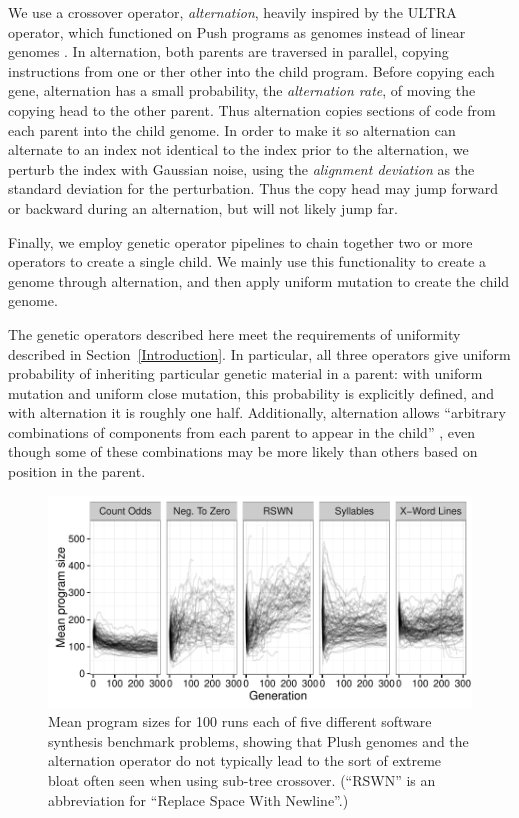 \documentclass[graybox]{svmult}
\begin{document}
We use a crossover operator, \textit{alternation}, heavily inspired by the ULTRA operator, which functioned on Push programs as genomes instead of linear genomes \cite{Spector:2013:GPTP}. In alternation, both parents are traversed in parallel, copying instructions from one or ther other into the child program. Before copying each gene, alternation has a small probability, the \textit{alternation rate}, of moving the copying head to the other parent. Thus alternation copies sections of code from each parent into the child genome. In order to make it so alternation can alternate to an index not identical to the index prior to the alternation, we perturb the index with Gaussian noise, using the \textit{alignment deviation} as the standard deviation for the perturbation. Thus the copy head may jump forward or backward during an alternation, but will not likely jump far.

Finally, we employ genetic operator pipelines to chain together two or more operators to create a single child. We mainly use this functionality to create a genome through alternation, and then apply uniform mutation to create the child genome.

The genetic operators described here meet the requirements of uniformity described in Section~\ref{Introduction}. In particular, all three operators give uniform probability of inheriting particular genetic material in a parent: with uniform mutation and uniform close mutation, this probability is explicitly defined, and with alternation it is roughly one half. Additionally, alternation allows ``arbitrary combinations of components from each parent to appear in the child'' \cite{Spector:2013:GPTP}, even though some of these combinations may be more likely than others based on position in the parent.

\begin{figure}[tb]
\includegraphics[width=\textwidth]{program_sizes_3x6_relabelled}
\caption{Mean program sizes for 100 runs each of five different software synthesis benchmark problems, showing that Plush genomes and the alternation operator do not typically lead to the sort of extreme bloat often seen when using sub-tree crossover. (``RSWN'' is an abbreviation for ``Replace Space With Newline''.)}
\label{fig:programSizes}
\end{figure}
\end{document}
